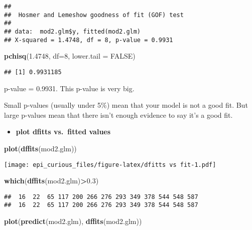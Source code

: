 \documentclass[
]{article}
\newenvironment{Shaded}{\begin{snugshade}}{\end{snugshade}}
\newcommand{\DataTypeTok}[1]{\textcolor[rgb]{0.13,0.29,0.53}{#1}}
\newcommand{\DecValTok}[1]{\textcolor[rgb]{0.00,0.00,0.81}{#1}}
\newcommand{\FloatTok}[1]{\textcolor[rgb]{0.00,0.00,0.81}{#1}}
\newcommand{\KeywordTok}[1]{\textcolor[rgb]{0.13,0.29,0.53}{\textbf{#1}}}
\newcommand{\NormalTok}[1]{#1}
\newcommand{\OperatorTok}[1]{\textcolor[rgb]{0.81,0.36,0.00}{\textbf{#1}}}
\newcommand{\OtherTok}[1]{\textcolor[rgb]{0.56,0.35,0.01}{#1}}
\providecommand{\tightlist}{%
  \setlength{\itemsep}{0pt}\setlength{\parskip}{0pt}}
\begin{document}
\begin{verbatim}
## 
##  Hosmer and Lemeshow goodness of fit (GOF) test
## 
## data:  mod2.glm$y, fitted(mod2.glm)
## X-squared = 1.4748, df = 8, p-value = 0.9931
\end{verbatim}

\begin{Shaded}
\begin{Highlighting}[]
\KeywordTok{pchisq}\NormalTok{(}\FloatTok{1.4748}\NormalTok{, }\DataTypeTok{df=}\DecValTok{8}\NormalTok{, }\DataTypeTok{lower.tail =} \OtherTok{FALSE}\NormalTok{)}
\end{Highlighting}
\end{Shaded}

\begin{verbatim}
## [1] 0.9931185
\end{verbatim}

p-value = 0.9931. This p-value is very big.

Small p-values (usually under 5\%) mean that your model is not a good
fit. But large p-values mean that there isn't enough evidence to say
it's a good fit.

\begin{itemize}
\tightlist
\item
  \textbf{plot dfitts vs.~fitted values}
\end{itemize}

\begin{Shaded}
\begin{Highlighting}[]
\KeywordTok{plot}\NormalTok{(}\KeywordTok{dffits}\NormalTok{(mod2.glm))}
\end{Highlighting}
\end{Shaded}

\texttt{[image: epi\_curious\_files/figure-latex/dfitts vs fit-1.pdf]}

\begin{Shaded}
\begin{Highlighting}[]
\KeywordTok{which}\NormalTok{(}\KeywordTok{dffits}\NormalTok{(mod2.glm)}\OperatorTok{>}\FloatTok{0.3}\NormalTok{)}
\end{Highlighting}
\end{Shaded}

\begin{verbatim}
##  16  22  65 117 200 266 276 293 349 378 544 548 587 
##  16  22  65 117 200 266 276 293 349 378 544 548 587
\end{verbatim}

\begin{Shaded}
\begin{Highlighting}[]
\KeywordTok{plot}\NormalTok{(}\KeywordTok{predict}\NormalTok{(mod2.glm), }\KeywordTok{dffits}\NormalTok{(mod2.glm))}
\end{Highlighting}
\end{Shaded}
\end{document}
